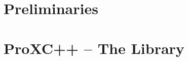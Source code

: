 \documentclass[10pt,b5paper]{report}
\begin{document}
 


\setcounter{page}{0}





\setcounter{page}{0}



\part{Preliminaries}

%


\part{ProXC++ -- The Library}








\appendix



  
\end{document}
